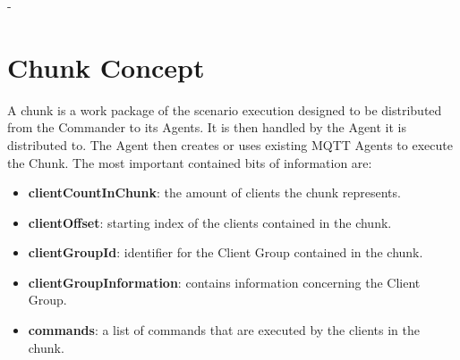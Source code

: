 -\section{Chunk Concept}
A chunk is a work package of the scenario execution designed to be distributed from the Commander to its Agents.
It is then handled by the Agent it is distributed to.
The Agent then creates or uses existing MQTT Agents to execute the Chunk.
The most important contained bits of information are:
\begin{itemize}
	\item \textbf{clientCountInChunk}: the amount of clients the chunk represents.
	\item \textbf{clientOffset}: starting index of the clients contained in the chunk.
	\item \textbf{clientGroupId}: identifier for the Client Group contained in the chunk.
	\item \textbf{clientGroupInformation}: contains information concerning the Client Group.
	\item \textbf{commands}: a list of commands that are executed by the clients in the chunk.
\end{itemize}

